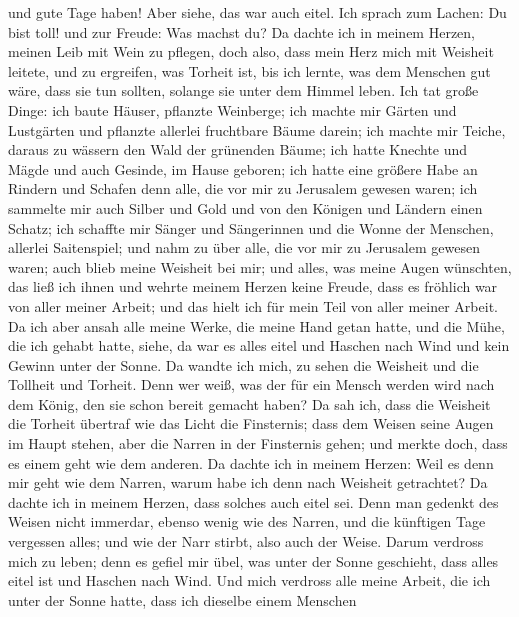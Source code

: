 und gute Tage haben! Aber siehe, das war auch eitel.  Ich
sprach zum Lachen: Du bist toll! und zur Freude: Was machst du?
 Da dachte ich in meinem Herzen, meinen Leib mit Wein zu
pflegen, doch also, dass mein Herz mich mit Weisheit leitete, und zu
ergreifen, was Torheit ist, bis ich lernte, was dem Menschen gut wäre,
dass sie tun sollten, solange sie unter dem Himmel leben. 
Ich tat große Dinge: ich baute Häuser, pflanzte Weinberge; 
ich machte mir Gärten und Lustgärten und pflanzte allerlei fruchtbare
Bäume darein;  ich machte mir Teiche, daraus zu wässern den
Wald der grünenden Bäume;  ich hatte Knechte und Mägde und
auch Gesinde, im Hause geboren; ich hatte eine größere Habe an Rindern
und Schafen denn alle, die vor mir zu Jerusalem gewesen waren;
 ich sammelte mir auch Silber und Gold und von den Königen
und Ländern einen Schatz; ich schaffte mir Sänger und Sängerinnen und
die Wonne der Menschen, allerlei Saitenspiel;  und nahm zu
über alle, die vor mir zu Jerusalem gewesen waren; auch blieb meine
Weisheit bei mir;  und alles, was meine Augen wünschten,
das ließ ich ihnen und wehrte meinem Herzen keine Freude, dass es
fröhlich war von aller meiner Arbeit; und das hielt ich für mein Teil
von aller meiner Arbeit.  Da ich aber ansah alle meine
Werke, die meine Hand getan hatte, und die Mühe, die ich gehabt hatte,
siehe, da war es alles eitel und Haschen nach Wind und kein Gewinn unter
der Sonne.  Da wandte ich mich, zu sehen die Weisheit und
die Tollheit und Torheit. Denn wer weiß, was der für ein Mensch werden
wird nach dem König, den sie schon bereit gemacht haben? 
Da sah ich, dass die Weisheit die Torheit übertraf wie das Licht die
Finsternis;  dass dem Weisen seine Augen im Haupt stehen,
aber die Narren in der Finsternis gehen; und merkte doch, dass es einem
geht wie dem anderen.  Da dachte ich in meinem Herzen: Weil
es denn mir geht wie dem Narren, warum habe ich denn nach Weisheit
getrachtet? Da dachte ich in meinem Herzen, dass solches auch eitel sei.
 Denn man gedenkt des Weisen nicht immerdar, ebenso wenig
wie des Narren, und die künftigen Tage vergessen alles; und wie der Narr
stirbt, also auch der Weise.  Darum verdross mich zu leben;
denn es gefiel mir übel, was unter der Sonne geschieht, dass alles eitel
ist und Haschen nach Wind.  Und mich verdross alle meine
Arbeit, die ich unter der Sonne hatte, dass ich dieselbe einem Menschen
